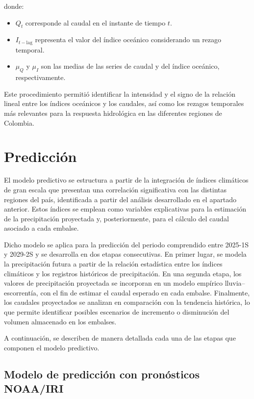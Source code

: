 donde:

\begin{itemize}
    \item $Q_t$ corresponde al caudal en el instante de tiempo $t$.
    \item $I_{t-\text{lag}}$ representa el valor del índice oceánico considerando un rezago temporal.
    \item $\mu_Q$ y $\mu_I$ son las medias de las series de caudal y del índice oceánico, respectivamente.
\end{itemize}

Este procedimiento permitió identificar la intensidad y el signo de la relación lineal entre los índices oceánicos y los caudales, así como los rezagos temporales más relevantes para la respuesta hidrológica en las diferentes regiones de Colombia.

\section{Predicción}
\label{sec:chp2-1}
El modelo predictivo se estructura a partir de la integración de índices climáticos de gran escala que presentan una correlación significativa con las distintas regiones del país, identificada a partir del análisis desarrollado en el apartado anterior. Estos índices se emplean como variables explicativas para la estimación de la precipitación proyectada y, posteriormente, para el cálculo del caudal asociado a cada embalse.

Dicho modelo se aplica para la predicción del periodo comprendido entre 2025-1S y 2029-2S y se desarrolla en dos etapas consecutivas. En primer lugar, se modela la precipitación futura a partir de la relación estadística entre los índices climáticos y los registros históricos de precipitación. En una segunda etapa, los valores de precipitación proyectada se incorporan en un modelo empírico lluvia–escorrentía, con el fin de estimar el caudal esperado en cada embalse. Finalmente, los caudales proyectados se analizan en comparación con la tendencia histórica, lo que permite identificar posibles escenarios de incremento o disminución del volumen almacenado en los embalses.

A continuación, se describen de manera detallada cada una de las etapas que componen el modelo predictivo.
\subsection{Modelo de predicción con pronósticos NOAA/IRI}

